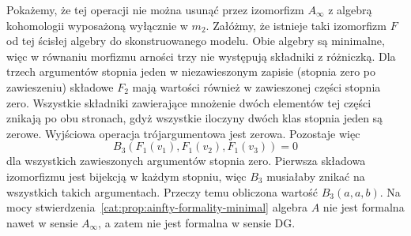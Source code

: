 \begin{przyklad}
Pokażemy, że tej operacji nie można usunąć przez izomorfizm $A_\infty$ z algebrą kohomologii wyposażoną wyłącznie w $m_2$. Załóżmy, że istnieje taki izomorfizm $F$ od tej ścisłej algebry do skonstruowanego modelu. Obie algebry są minimalne, więc w równaniu morfizmu arności trzy nie występują składniki z różniczką. Dla trzech argumentów stopnia jeden w niezawieszonym zapisie (stopnia zero po zawieszeniu) składowe $F_2$ mają wartości również w zawieszonej części stopnia zero. Wszystkie składniki zawierające mnożenie dwóch elementów tej części znikają po obu stronach, gdyż wszystkie iloczyny dwóch klas stopnia jeden są zerowe. Wyjściowa operacja trójargumentowa jest zerowa. Pozostaje więc
\[
 B_3(F_1(v_1),F_1(v_2),F_1(v_3))=0
\]
dla wszystkich zawieszonych argumentów stopnia zero. Pierwsza składowa izomorfizmu jest bijekcją w każdym stopniu, więc $B_3$ musiałaby znikać na wszystkich takich argumentach. Przeczy temu obliczona wartość $B_3(a,a,b)$. Na mocy stwierdzenia~\ref{cat:prop:ainfty-formality-minimal} algebra $A$ nie jest formalna nawet w sensie $A_\infty$, a zatem nie jest formalna w sensie DG.
\end{przyklad}

